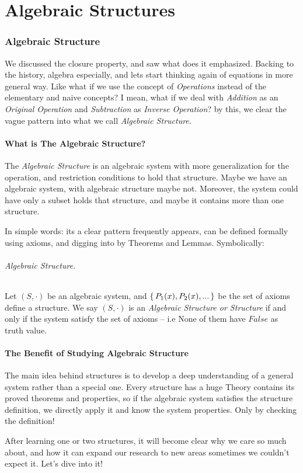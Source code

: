 \part{Algebraic Structures}
\section{Algebraic Structure}
We discussed the closure property, and saw what does it emphasized. Backing to the history, algebra especially, and lets start thinking again of equations in more general way. Like what if we use the concept of {\it Operations} instead of the elementary and naive concepts? I mean, what if we deal with {\it Addition} as an {\it Original Operation} and {\it Subtraction} as {\it Inverse Operation}? by this, we clear the vague pattern into what we call {\it Algebraic Structure}.

\subsection{What is The Algebraic Structure?}
The {\it Algebraic Structure} is an algebraic system with more generalization for the operation, and restriction conditions to hold that structure. Maybe we have an algebraic system, with algebraic structure maybe not. Moreover, the system could have only a subset holds that structure, and maybe it contains more than one structure.

In simple words: its a clear pattern frequently appears, can be defined formally using axioms, and digging into by Theorems and Lemmas. Symbolically:

\paragraph{Algebraic Structure.} Let $(S,\cdot)$ be an algebraic system, and $\set{P_1(x),P_2(x),...}$
be the set of axioms define a structure. We say $(S,\cdot)$ is an {\it Algebraic Structure or Structure} if and only if the system satisfy the set of axioms -- i.e None of them have $False$ as truth value. 

\subsection{The Benefit of Studying Algebraic Structure}
The main idea behind structures is to develop a deep understanding of a general system rather than a special one. Every structure has a huge Theory contains its proved theorems and properties, so if the algebraic system satisfies the structure definition, we directly apply it and know the system properties. Only by checking the definition!

After learning one or two structures, it will become clear why we care so much about, and how it can expand our research to new areas sometimes we couldn't expect it. Let's dive into it!